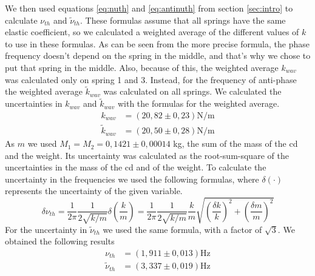 \documentclass{article}
\begin{document}
We then used equations \ref{eq:nuth} and \ref{eq:antinuth} from section \ref{sec:intro} to calculate $\nu_{th}$
and $\tilde \nu_{th}$. These formulas assume that all springs have
the same elastic coefficient, so we calculated a weighted average of
the different values of $k$ to use in these formulas. As can be seen from the more precise formula, the phase
frequency doesn't depend on the spring in the middle, and that's why we chose to put that spring in the middle. Also, because of this, the weighted average $k_{wav}$ was calculated only on spring 1 and 3.
Instead, for the frequency of anti-phase the weighted average 
$\tilde k_{wav}$ was calculated on all springs. We calculated the uncertainties in $k_{wav}$ and $\tilde k_{wav}$ with the formulas for the weighted average. 
\begin{align}
           k_{wav} &= (20,82 \pm 0,23) \text{N/m} \\
    \tilde k_{wav} &= (20,50 \pm 0,28) \text{N/m}
\end{align}
As $m$ we used $M_1=M_2=0,1421 \pm 0,00014$ kg, the sum of the mass of the cd and the weight. Its uncertainty was calculated as the root-sum-square of the uncertainties in the mass of the cd and of the weight.
To calculate the uncertainty in the frequencies we used the following formulas, where $\delta(\cdot)$ represents the uncertainty of the given variable.
\begin{equation} \label{eq:inc_nuth}
    \delta \nu_{th}
    = \frac{1}{2\pi} \frac{1}{2\sqrt{k/m}} \delta \left ( \frac{k}{m} \right )
    = \frac{1}{2\pi} \frac{1}{2\sqrt{k/m}}  \frac{k}{m} \sqrt{ \left ( \frac{ \delta k}{k}  \right ) ^2 +
           \left ( \frac{ \delta m}{m}  \right ) ^2}
\end{equation}
For the uncertainty in $\tilde \nu_{th}$ we used the same formula, with a factor of $\sqrt 3$. We obtained the following results
\begin{align}
           \nu_{th} &= (1,911 \pm 0,013) \text{Hz}\\
    \tilde \nu_{th} &= (3,337 \pm 0,019) \text{Hz}
\end{align}
\end{document}
